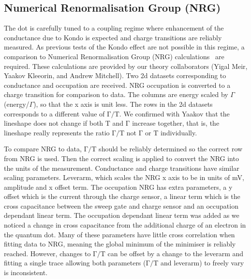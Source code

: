 \subsection{Numerical Renormalisation Group (NRG)}
The dot is carefully tuned to a coupling regime where enhancement of the conductance due to Kondo is expected and charge transitions are reliably measured. As previous tests of the Kondo effect are not possible in this regime, a comparison to Numerical Renormalisation Group (NRG) calculations~\cite{nrg} are required. These calculations are provided by our theory collaborators (Yigal Meir, Yaakov Kleeorin, and Andrew Mitchell). 
Two 2d datasets corresponding to conductance and occupation are received. NRG occupation is converted to a charge transition for comparison to data. The columns are energy scaled by $\Gamma$ (energy/$\Gamma$), so that the x axis is unit less. The rows in the 2d datasets corresponds to a different value of $\mathrm{\Gamma/T}$. We confirmed with Yaakov that the lineshape does not change if both $\mathrm{T}$ and $\mathrm{\Gamma}$ increase together, that is, the lineshape really represents the ratio $\mathrm{\Gamma/T}$ not $\mathrm{\Gamma}$ or $\mathrm{T}$ individually.

To compare NRG to data, $\mathrm{\Gamma/T}$ should be reliably determined so the correct row from NRG is used. Then the correct scaling is applied to convert the NRG into the units of the measurement. Conductance and charge transitions have similar scaling parameters. Leverarm, which scales the NRG x axis to be in units of mV, amplitude and x offset term. The occupation NRG has extra parameters, a y offset which is the current through the charge sensor, a linear term which is the cross capacitance between the sweep gate and charge sensor and an occupation dependant linear term. The occupation dependant linear term was added as we noticed a change in cross capacitance from the additional charge of an electron in the quantum dot. Many of these parameters have little cross correlation when fitting data to NRG, meaning the global minimum of the minimiser is reliably reached. However, changes to $\mathrm{\Gamma/T}$ can be offset by a change to the leverarm and fitting a single trace allowing both parameters ($\mathrm{\Gamma/T}$ and leverarm) to freely vary is inconsistent. 


